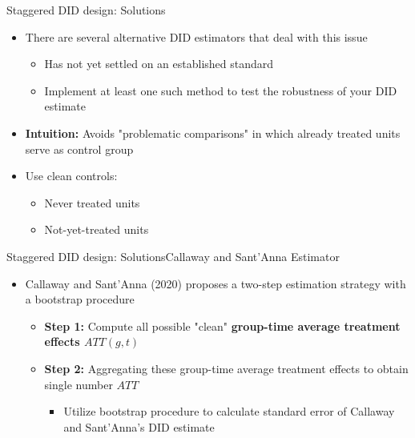\documentclass[dvipsnames,hyperref={pdfpagelabels=false}]{beamer}
\begin{document}
\begin{frame}{Staggered DID design: Solutions}{}
\begin{itemize}
	\item  There are several alternative DID estimators that deal with this issue
	\vspace{0.2cm}
	\begin{itemize}
		\item Has not yet settled on an established standard
		\vspace{0.2cm}
		\item Implement at least one such method to test the robustness of your DID estimate
		\vspace{0.2cm}
	
		\end{itemize}
	
	\item \textbf{Intuition:} Avoids "problematic comparisons" in which already treated units serve as control group
			\vspace{0.2cm}
	\item Use clean controls: 
			\vspace{0.2cm}
				\begin{itemize}
	\item Never treated units 
			\vspace{0.2cm}
	\item Not-yet-treated units
		\end{itemize}
	
	\end{itemize}
	
	
\end{frame}



\begin{frame}{Staggered DID design: Solutions}{Callaway and Sant'Anna Estimator}
	\begin{itemize}
		\item  Callaway and Sant'Anna (2020) proposes a two-step estimation strategy with a bootstrap procedure
		\vspace{0.2cm}
		\begin{itemize}
			\item \textbf{Step 1:} Compute all possible "clean" \textbf{group-time average treatment effects $ATT (g,t)$}
			\vspace{0.2cm}
			\item \textbf{Step 2:} Aggregating these group-time average treatment effects to obtain single number $ATT$
			\vspace{0.2cm}
					\begin{itemize}
			\item Utilize bootstrap procedure to calculate standard error of Callaway and Sant'Anna's DID estimate
					\end{itemize}
			
		\end{itemize}
		
		
		
	\end{itemize}
	
	
\end{frame}
\end{document}
